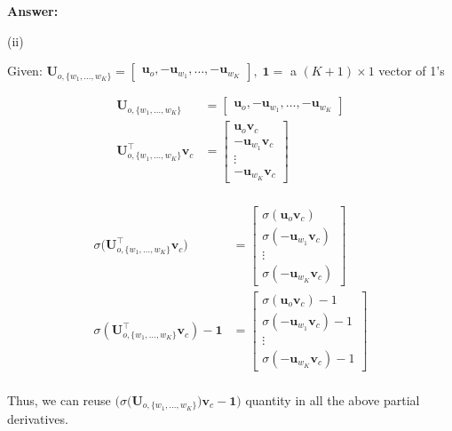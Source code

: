 \documentclass{article}
\newenvironment{answer}{
    {\bf Answer:} \sf \begingroup\color{red}
}{\endgroup}%
\begin{document}
\begin{enumerate}[label=(\alph*)]
\begin{shaded}
\begin{answer}
(ii) 

Given: $\bm{U}_{o, \{w_1, \dots, w_K\}} = \begin{bmatrix} \bm{u}_o, -\bm{u}_{w_1}, \dots, -\bm{u}_{w_K} \end{bmatrix}, \; \bm{1}=$ a $(K + 1) \times 1$ vector of 1's

\begin{equation*}
\begin{split}
\bm{U}_{o, \{w_1, \dots, w_K\}} & = \begin{bmatrix} \bm{u}_o, -\bm{u}_{w_1}, \dots, -\bm{u}_{w_K} \end{bmatrix}\\
\bm{U}_{o, \{w_1, \dots, w_K\}}^\top \bm v_c & = \begin{bmatrix}
           \bm{u}_o \bm v_c \\
           -\bm{u}_{w_1} \bm v_c \\
           \vdots \\
           -\bm{u}_{w_K}\bm v_c
         \end{bmatrix}\\
\end{split}
\end{equation*}

\color{red}

\begin{equation*}
\begin{split}
\sigma \big(\bm{U}_{o, \{w_1, \dots, w_K\}}^\top \bm v_c \big) & = \begin{bmatrix} \sigma( \bm{u}_o \bm v_c)\\ \sigma(-\bm{u}_{w_1}\bm v_c)\\ \vdots\\ \sigma(-\bm{u}_{w_K}\bm v_c) \end{bmatrix}\\
\sigma(\bm{U}_{o, \{w_1, \dots, w_K\}}^\top \bm v_c) - \bm 1 & = \begin{bmatrix}
           \sigma( \bm{u}_o \bm v_c) - 1\\
           \sigma( -\bm{u}_{w_1} \bm v_c) - 1\\
           \vdots \\
           \sigma( -\bm{u}_{w_K}\bm v_c) - 1
         \end{bmatrix}\\
\end{split}
\end{equation*}

Thus, we can reuse $\Big( \sigma \big(\bm{U}_{o, \{w_1, \dots, w_K\}} \big)\bm v_c - \bm 1 \Big)$ quantity in all the above partial derivatives.


\end{answer}
\end{shaded}
\end{enumerate}
\end{document}
